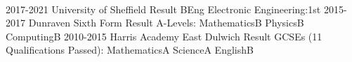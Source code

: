 \documentclass[9pt]{developercv} %
\begin{document}
\vspace{0.5cm}


\begin{minipage}[t]{0.32\textwidth}%

	\vspace{0.1cm} %
	\lorem \lorem \lorem \lorem \lorem\\ %
\end{minipage}
\hfill
\begin{minipage}[t]{0.62\textwidth}

	\vspace{0.1cm} %
	\halfentry
		{2017-2021}
		{University of Sheffield}
		{Result}
		{BEng Electronic Engineering:\hfill1st}
	\halfentry
		{2015-2017}
		{Dunraven Sixth Form}
		{Result}
		{
			A-Levels:\newline
			\hspace*{0.5cm}Mathematics\hfill B\newline
			\hspace*{0.5cm}Physics\hfill B\newline
			\hspace*{0.5cm}Computing\hfill B\newline
		}
	\halfentry
		{2010-2015}
		{Harris Academy East Dulwich}
		{Result}
		{
			GCSEs (11 Qualifications Passed):\newline
			\hspace*{0.5cm}Mathematics\hfill A\newline
			\hspace*{0.5cm}Science\hfill A\newline
			\hspace*{0.5cm}English\hfill B\newline
		}
\end{minipage}



\end{document}
